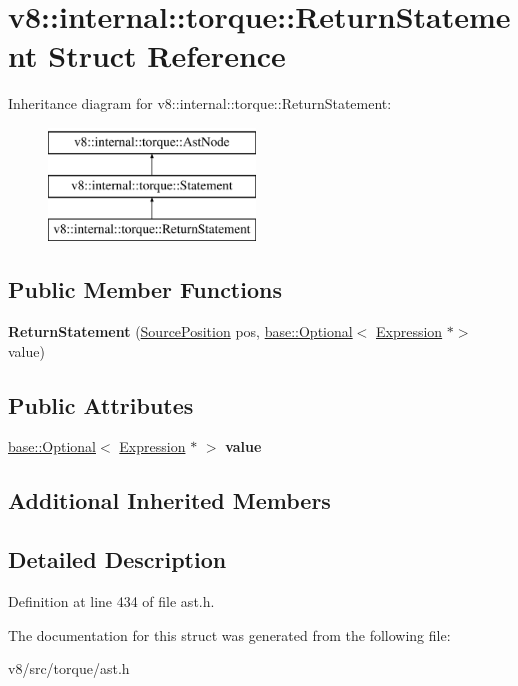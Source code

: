 \hypertarget{structv8_1_1internal_1_1torque_1_1ReturnStatement}{}\section{v8\+:\+:internal\+:\+:torque\+:\+:Return\+Statement Struct Reference}
\label{structv8_1_1internal_1_1torque_1_1ReturnStatement}
Inheritance diagram for v8\+:\+:internal\+:\+:torque\+:\+:Return\+Statement\+:\begin{figure}[H]
\begin{center}
\leavevmode
\includegraphics[height=3.000000cm]{structv8_1_1internal_1_1torque_1_1ReturnStatement}
\end{center}
\end{figure}
\subsection*{Public Member Functions}
\begin{DoxyCompactItemize}
\item 
\mbox{\label{structv8_1_1internal_1_1torque_1_1ReturnStatement_ad714bc74d7c77a7904f142521472e8e2}} 
{\bfseries Return\+Statement} (\mbox{\hyperlink{structv8_1_1internal_1_1torque_1_1SourcePosition}{Source\+Position}} pos, \mbox{\hyperlink{classv8_1_1base_1_1Optional}{base\+::\+Optional}}$<$ \mbox{\hyperlink{structv8_1_1internal_1_1torque_1_1Expression}{Expression}} $\ast$$>$ value)
\end{DoxyCompactItemize}
\subsection*{Public Attributes}
\begin{DoxyCompactItemize}
\item 
\mbox{\label{structv8_1_1internal_1_1torque_1_1ReturnStatement_a05761f17935a77bb75ef2550e2928f42}} 
\mbox{\hyperlink{classv8_1_1base_1_1Optional}{base\+::\+Optional}}$<$ \mbox{\hyperlink{structv8_1_1internal_1_1torque_1_1Expression}{Expression}} $\ast$ $>$ {\bfseries value}
\end{DoxyCompactItemize}
\subsection*{Additional Inherited Members}


\subsection{Detailed Description}


Definition at line 434 of file ast.\+h.



The documentation for this struct was generated from the following file\+:\begin{DoxyCompactItemize}
\item 
v8/src/torque/ast.\+h\end{DoxyCompactItemize}
